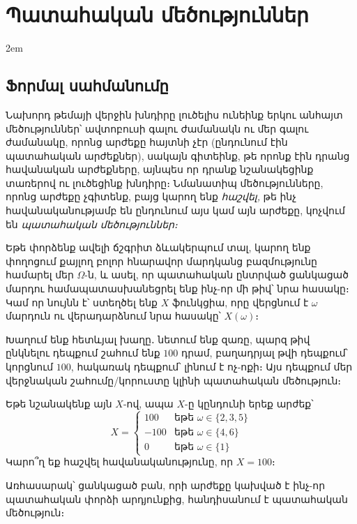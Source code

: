 \setchapterpreamble[u]{\margintoc}
\chapter{Պատահական մեծություններ}

\emergencystretch 2em

\section{Ֆորմալ սահմանումը}

Նախորդ թեմայի վերջին խնդիրը լուծելիս ունեինք երկու անհայտ մեծություններ՝ ավտոբուսի գալու ժամանակն ու մեր գալու ժամանակը, որոնց արժեքը հայտնի չէր (ընդունում էին պատահական արժեքներ), սակայն գիտեինք, թե որոնք էին դրանց հավանական արժեքները, այնպես որ դրանք նշանակեցինք տառերով ու լուծեցինք խնդիրը։ Նմանատիպ մեծությունները, որոնց արժեքը չգիտենք, բայց կարող ենք \textit{հաշվել,} թե ինչ հավանականությամբ են ընդունում այս կամ այն արժեքը,  կոչվում են \textit{պատահական մեծություններ։}


Եթե փորձենք ավելի ճշգրիտ ձևակերպում տալ, կարող ենք փողոցում քայլող բոլոր հնարավոր մարդկանց բազմությունը համարել մեր $\Omega$-ն, և ասել, որ պատահական ընտրված ցանկացած մարդու համապատասխա\-նեց\-րել ենք ինչ-որ մի թիվ՝ նրա հասակը։ Կամ որ նույնն է՝ ստեղծել ենք $X$ ֆունկցիա, որը վերցնում է $\omega$ մարդուն ու վերադարձնում նրա հասակը՝ $X(\omega)$։ 

\begin{example}\label{die_game}
Խաղում ենք հետևյալ խաղը․ նետում ենք զառը, պարզ թիվ ընկնելու դեպքում շահում ենք $100$ դրամ, բաղադրյալ թվի դեպքում՝ կորցնում $100$, հակառակ դեպքում՝ լինում է ոչ-ոքի։ Այս դեպքում մեր վերջնական շահումը/կորուստը կլինի պատահական մեծություն։ 

Եթե նշանակենք այն $X$-ով, ապա $X$-ը կընդունի երեք արժեք՝
\[ X  =
\begin{cases}
100 & \text{եթե } \omega \in \{2, 3, 5\} \\
-100 & \text{եթե } \omega \in \{4, 6\} \\
0 & \text{եթե } \omega \in \{1\}
\end{cases}
\]
Կարո՞ղ եք հաշվել հավանականությունը, որ $X=100$։
\end{example}

Առհասարակ՝ ցանկացած բան, որի արժեքը կախված է ինչ-որ  պատահական փորձի արդյունքից, հանդիսանում է պատահական մեծություն։

